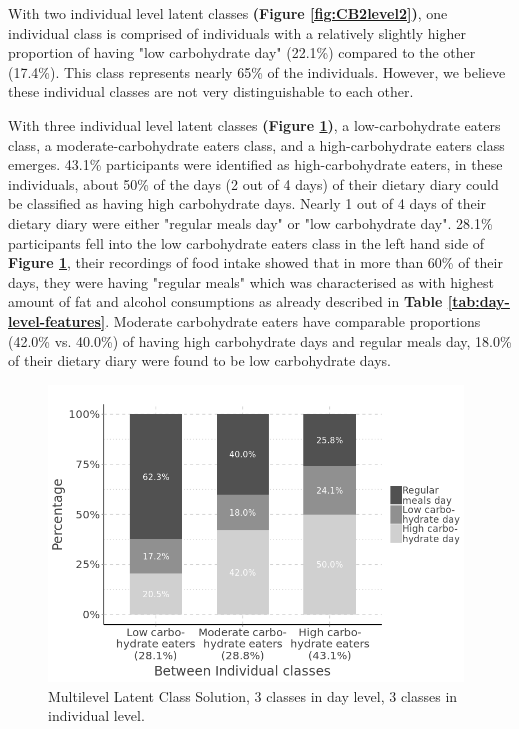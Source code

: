 With two individual level latent classes \textbf{(Figure \ref{fig:CB2level2})}, one individual class is comprised of individuals with a relatively slightly higher proportion of having "low carbohydrate day" (22.1\%) compared to the other (17.4\%). This class represents nearly 65\% of the individuals. However, we believe these individual classes are not very distinguishable to each other.

With three individual level latent classes \textbf{(Figure \ref{fig:level2})}, a low-carbohydrate eaters class, a moderate-carbohydrate eaters class, and a high-carbohydrate eaters class emerges. 43.1\% participants were identified as high-carbohydrate eaters, in these individuals, about 50\% of the days (2 out of 4 days) of their dietary diary could be classified as having high carbohydrate days. Nearly 1 out of 4 days of their dietary diary were either "regular meals day" or "low carbohydrate day". 28.1\% participants fell into the low carbohydrate eaters class in the left hand side of \textbf{Figure \ref{fig:level2}}, their recordings of food intake showed that in more than 60\% of their days, they were having "regular meals" which was characterised as with highest amount of fat and alcohol consumptions as already described in \textbf{Table \ref{tab:day-level-features}}. Moderate carbohydrate eaters have comparable proportions (42.0\% vs. 40.0\%) of having high carbohydrate days and regular meals day, 18.0\% of their dietary diary were found to be low carbohydrate days.

\begin{figure}
	\centering
	\includegraphics[width=11cm]{Figures/level2.png}
	\decoRule
	\caption[Multilevel Latent Class Solution ($3\times3$).]{Multilevel Latent Class Solution, 3 classes in day level, 3 classes in individual level.}
	\label{fig:level2}
\end{figure}

